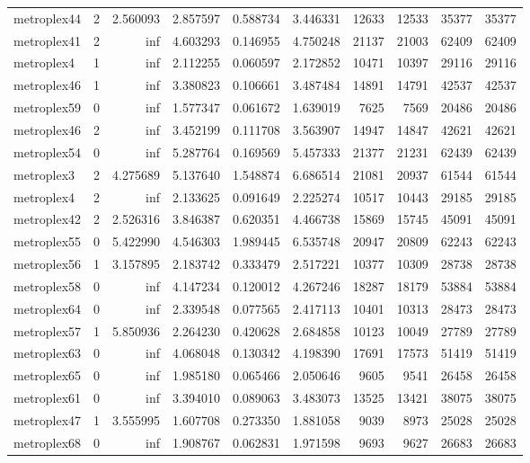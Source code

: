 \begin{longtable}{|l|r|r|r|r|r|r|r|r|r|}
metroplex44 & 2 & 2.560093 & 2.857597 & 0.588734 & 3.446331 & 12633 & 12533 & 35377 & 35377 \\
metroplex41 & 2 & inf & 4.603293 & 0.146955 & 4.750248 & 21137 & 21003 & 62409 & 62409 \\
metroplex4 & 1 & inf & 2.112255 & 0.060597 & 2.172852 & 10471 & 10397 & 29116 & 29116 \\
metroplex46 & 1 & inf & 3.380823 & 0.106661 & 3.487484 & 14891 & 14791 & 42537 & 42537 \\
metroplex59 & 0 & inf & 1.577347 & 0.061672 & 1.639019 & 7625 & 7569 & 20486 & 20486 \\
metroplex46 & 2 & inf & 3.452199 & 0.111708 & 3.563907 & 14947 & 14847 & 42621 & 42621 \\
metroplex54 & 0 & inf & 5.287764 & 0.169569 & 5.457333 & 21377 & 21231 & 62439 & 62439 \\
metroplex3 & 2 & 4.275689 & 5.137640 & 1.548874 & 6.686514 & 21081 & 20937 & 61544 & 61544 \\
metroplex4 & 2 & inf & 2.133625 & 0.091649 & 2.225274 & 10517 & 10443 & 29185 & 29185 \\
metroplex42 & 2 & 2.526316 & 3.846387 & 0.620351 & 4.466738 & 15869 & 15745 & 45091 & 45091 \\
metroplex55 & 0 & 5.422990 & 4.546303 & 1.989445 & 6.535748 & 20947 & 20809 & 62243 & 62243 \\
metroplex56 & 1 & 3.157895 & 2.183742 & 0.333479 & 2.517221 & 10377 & 10309 & 28738 & 28738 \\
metroplex58 & 0 & inf & 4.147234 & 0.120012 & 4.267246 & 18287 & 18179 & 53884 & 53884 \\
metroplex64 & 0 & inf & 2.339548 & 0.077565 & 2.417113 & 10401 & 10313 & 28473 & 28473 \\
metroplex57 & 1 & 5.850936 & 2.264230 & 0.420628 & 2.684858 & 10123 & 10049 & 27789 & 27789 \\
metroplex63 & 0 & inf & 4.068048 & 0.130342 & 4.198390 & 17691 & 17573 & 51419 & 51419 \\
metroplex65 & 0 & inf & 1.985180 & 0.065466 & 2.050646 & 9605 & 9541 & 26458 & 26458 \\
metroplex61 & 0 & inf & 3.394010 & 0.089063 & 3.483073 & 13525 & 13421 & 38075 & 38075 \\
metroplex47 & 1 & 3.555995 & 1.607708 & 0.273350 & 1.881058 & 9039 & 8973 & 25028 & 25028 \\
metroplex68 & 0 & inf & 1.908767 & 0.062831 & 1.971598 & 9693 & 9627 & 26683 & 26683 \\

\end{longtable}

